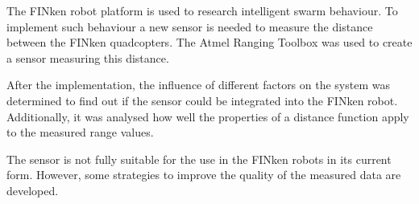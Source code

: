 
The FINken robot platform is used to research intelligent swarm behaviour.
To implement such behaviour a new sensor is needed to measure the distance between the FINken quadcopters.
The Atmel Ranging Toolbox was used to create a sensor measuring this distance.

After the implementation, the influence of different factors on the system was determined to find out if the sensor could be integrated into the FINken robot.
Additionally, it was analysed how well the properties of a distance function apply to the measured range values.

The sensor is not fully suitable for the use in the FINken robots in its current form.
However, some strategies to improve the quality of the measured data are developed.
